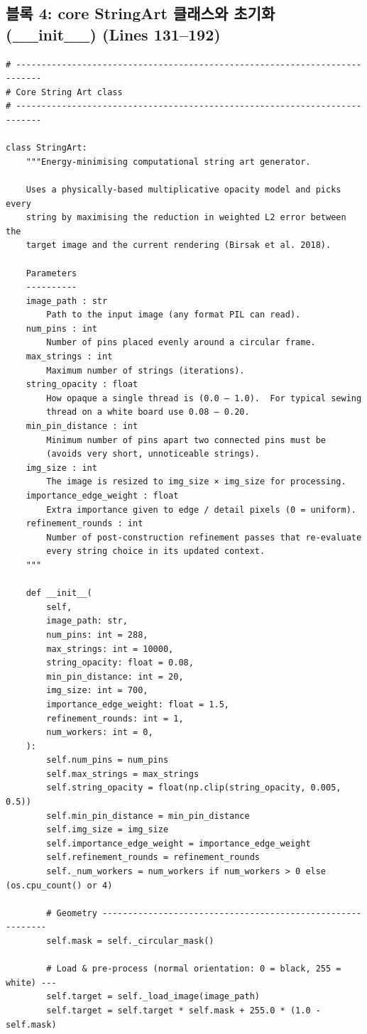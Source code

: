 \subsection*{블록 4: core StringArt 클래스와 초기화 (__init__) (Lines 131--192)}
\begin{lstlisting}[firstnumber=131]
# ---------------------------------------------------------------------------
# Core String Art class
# ---------------------------------------------------------------------------

class StringArt:
    """Energy-minimising computational string art generator.

    Uses a physically-based multiplicative opacity model and picks every
    string by maximising the reduction in weighted L2 error between the
    target image and the current rendering (Birsak et al. 2018).

    Parameters
    ----------
    image_path : str
        Path to the input image (any format PIL can read).
    num_pins : int
        Number of pins placed evenly around a circular frame.
    max_strings : int
        Maximum number of strings (iterations).
    string_opacity : float
        How opaque a single thread is (0.0 – 1.0).  For typical sewing
        thread on a white board use 0.08 – 0.20.
    min_pin_distance : int
        Minimum number of pins apart two connected pins must be
        (avoids very short, unnoticeable strings).
    img_size : int
        The image is resized to img_size × img_size for processing.
    importance_edge_weight : float
        Extra importance given to edge / detail pixels (0 = uniform).
    refinement_rounds : int
        Number of post-construction refinement passes that re-evaluate
        every string choice in its updated context.
    """

    def __init__(
        self,
        image_path: str,
        num_pins: int = 288,
        max_strings: int = 10000,
        string_opacity: float = 0.08,
        min_pin_distance: int = 20,
        img_size: int = 700,
        importance_edge_weight: float = 1.5,
        refinement_rounds: int = 1,
        num_workers: int = 0,
    ):
        self.num_pins = num_pins
        self.max_strings = max_strings
        self.string_opacity = float(np.clip(string_opacity, 0.005, 0.5))
        self.min_pin_distance = min_pin_distance
        self.img_size = img_size
        self.importance_edge_weight = importance_edge_weight
        self.refinement_rounds = refinement_rounds
        self._num_workers = num_workers if num_workers > 0 else (os.cpu_count() or 4)

        # Geometry -----------------------------------------------------------
        self.mask = self._circular_mask()

        # Load & pre-process (normal orientation: 0 = black, 255 = white) ---
        self.target = self._load_image(image_path)
        self.target = self.target * self.mask + 255.0 * (1.0 - self.mask)

\end{lstlisting}
